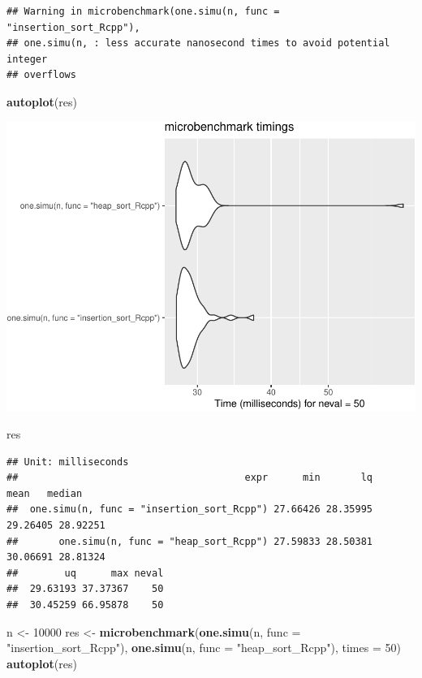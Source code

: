 \documentclass[
]{article}
\newenvironment{Shaded}{\begin{snugshade}}{\end{snugshade}}
\newcommand{\AttributeTok}[1]{\textcolor[rgb]{0.13,0.29,0.53}{#1}}
\newcommand{\DecValTok}[1]{\textcolor[rgb]{0.00,0.00,0.81}{#1}}
\newcommand{\FunctionTok}[1]{\textcolor[rgb]{0.13,0.29,0.53}{\textbf{#1}}}
\newcommand{\NormalTok}[1]{#1}
\newcommand{\OtherTok}[1]{\textcolor[rgb]{0.56,0.35,0.01}{#1}}
\newcommand{\StringTok}[1]{\textcolor[rgb]{0.31,0.60,0.02}{#1}}
\begin{document}
\begin{verbatim}
## Warning in microbenchmark(one.simu(n, func = "insertion_sort_Rcpp"),
## one.simu(n, : less accurate nanosecond times to avoid potential integer
## overflows
\end{verbatim}

\begin{Shaded}
\begin{Highlighting}[]
\FunctionTok{autoplot}\NormalTok{(res)}
\end{Highlighting}
\end{Shaded}

\includegraphics{Sorting_analyse_files/figure-latex/unnamed-chunk-11-1.pdf}

\begin{Shaded}
\begin{Highlighting}[]
\NormalTok{res}
\end{Highlighting}
\end{Shaded}

\begin{verbatim}
## Unit: milliseconds
##                                       expr      min       lq     mean   median
##  one.simu(n, func = "insertion_sort_Rcpp") 27.66426 28.35995 29.26405 28.92251
##       one.simu(n, func = "heap_sort_Rcpp") 27.59833 28.50381 30.06691 28.81324
##        uq      max neval
##  29.63193 37.37367    50
##  30.45259 66.95878    50
\end{verbatim}

\begin{Shaded}
\begin{Highlighting}[]
\NormalTok{n }\OtherTok{\textless{}{-}} \DecValTok{10000}
\NormalTok{res }\OtherTok{\textless{}{-}} \FunctionTok{microbenchmark}\NormalTok{(}\FunctionTok{one.simu}\NormalTok{(n, }\AttributeTok{func =} \StringTok{"insertion\_sort\_Rcpp"}\NormalTok{), }\FunctionTok{one.simu}\NormalTok{(n, }\AttributeTok{func =} \StringTok{"heap\_sort\_Rcpp"}\NormalTok{), }\AttributeTok{times =} \DecValTok{50}\NormalTok{)}
\FunctionTok{autoplot}\NormalTok{(res)}
\end{Highlighting}
\end{Shaded}
\end{document}
